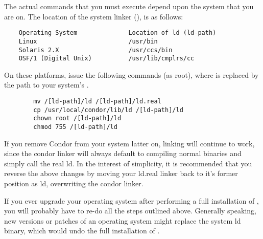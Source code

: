 The actual commands that you must execute depend upon the system that you
are on.  The location of the system linker (), is as follows:
\begin{verbatim}
	Operating System              Location of ld (ld-path)
	Linux                         /usr/bin
	Solaris 2.X                   /usr/ccs/bin
	OSF/1 (Digital Unix)          /usr/lib/cmplrs/cc
\end{verbatim}

On these platforms, issue the following commands (as root), where
 is replaced by the path to your system's .
\begin{verbatim}
        mv /[ld-path]/ld /[ld-path]/ld.real
        cp /usr/local/condor/lib/ld /[ld-path]/ld
        chown root /[ld-path]/ld
        chmod 755 /[ld-path]/ld
\end{verbatim}

If you remove Condor from your system latter on, linking will continue
to work, since the condor linker will always default to compiling
normal binaries and simply call the real ld.  In the interest of
simplicity, it is recommended that you reverse the above changes by
moving your ld.real linker back to it's former position as ld,
overwriting the condor linker.

\Note If you ever upgrade your operating system after performing a
full installation of , you will probably have to re-do
all the steps outlined above.
Generally speaking, new versions or patches of an operating system
might replace the system ld binary, which would undo the
full installation of .

